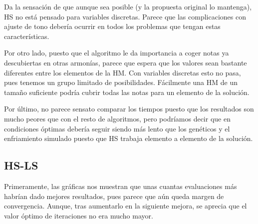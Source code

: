 \vspace{\baselineskip}

Da la sensación de que aunque sea posible (y la propuesta original lo mantenga), HS no está pensado para variables discretas. Parece que las complicaciones con ajuste de tono debería ocurrir en todos los problemas que tengan estas características.

\vspace{\baselineskip}

Por otro lado, puesto que el algoritmo le da importancia a coger notas ya descubiertas en otras armonías, parece que espera que los valores sean bastante diferentes entre los elementos de la HM. Con variables discretas esto no pasa, pues tenemos un grupo limitado de posibilidades. Fácilmente una HM de un tamaño suficiente podría cubrir todas las notas para un elemento de la solución.

\vspace{\baselineskip}

Por último, no parece sensato comparar los tiempos puesto que los resultados son mucho peores que con el resto de algoritmos, pero podríamos decir que en condiciones óptimas debería seguir siendo más lento que los genéticos y el enfriamiento simulado puesto que HS trabaja elemento a elemento de la solución.




\newpage

\subsection{HS-LS}

Primeramente, las gráficas nos muestran que unas cuantas evaluaciones más habrían dado mejores resultados, pues parece que aún queda margen de convergencia. Aunque, tras aumentarlo en la siguiente mejora, se aprecia que el valor óptimo de iteraciones no era mucho mayor. 

